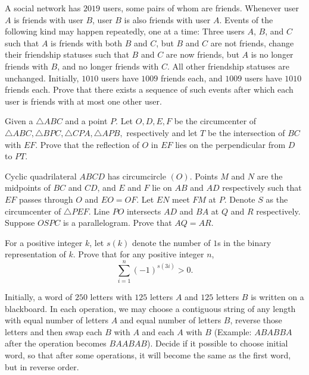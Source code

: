 \documentclass[11pt]{scrartcl}
\begin{document}
\begin{problem}[8690567757444826166]
	A social network has $2019$ users, some pairs of whom are friends. Whenever user $A$ is friends with user $B$, user $B$ is also friends with user $A$. Events of the following kind may happen repeatedly, one at a time:
Three users $A$, $B$, and $C$ such that $A$ is friends with both $B$ and $C$, but $B$ and $C$ are not friends, change their friendship statuses such that $B$ and $C$ are now friends, but $A$ is no longer friends with $B$, and no longer friends with $C$. All other friendship statuses are unchanged.
Initially, $1010$ users have $1009$ friends each, and $1009$ users have $1010$ friends each. Prove that there exists a sequence of such events after which each user is friends with at most one other user.

\end{problem}
\begin{problem}[8569243655022492300]
	Given a $ \triangle ABC $ and a point $ P. $ Let $ O, D, E, F $ be the circumcenter of $ \triangle ABC, \triangle BPC, \triangle CPA, \triangle APB, $ respectively and let $ T $ be the intersection of $ BC $ with $ EF. $ Prove that the reflection of $ O $ in $ EF $ lies on the perpendicular from $ D $ to $ PT. $
\end{problem}
\begin{problem}[6612845742708555351]
	Cyclic quadrilateral $ABCD$ has circumcircle $(O)$. Points $M$ and $N$ are the midpoints of $BC$ and $CD$, and $E$ and $F$ lie on $AB$ and $AD$ respectively such that $EF$ passes through $O$ and $EO=OF$. Let $EN$ meet $FM$ at $P$. Denote $S$ as the circumcenter of $\triangle PEF$. Line $PO$ intersects $AD$ and $BA$ at $Q$ and $R$ respectively. Suppose $OSPC$ is a parallelogram. Prove that $AQ=AR$.
\end{problem}
\begin{problem}[402139377468684]
For a positive integer $k$, let $s(k)$ denote the number of $1$s in the binary representation of $k$. Prove that for any positive integer $n$,
\[\sum_{i=1}^{n}(-1)^{s(3i)} > 0.\]
\end{problem}
\begin{problem}[6497483389877629432]
Initially, a word of $250$ letters with $125$ letters $A$ and $125$ letters $B$ is written on a blackboard. In each operation, we may choose a contiguous string of any length with equal number of letters $A$ and equal number of letters $B$, reverse those letters and then swap each $B$ with $A$ and each $A$ with $B$ (Example: $ABABBA$ after the operation becomes $BAABAB$). Decide if it possible to choose initial word, so that after some operations, it will become the same as the first word, but in reverse order.
\end{problem}
\end{document}

